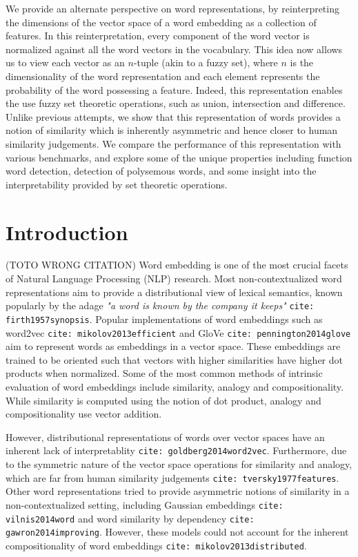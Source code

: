 \documentclass[11pt]{book}
\newcommand{\citep}[1]{\texttt{cite: #1}}
\begin{document}
We provide an alternate perspective on word representations, by
reinterpreting the dimensions of the vector space of a word embedding as a
collection of features. In this reinterpretation, every component of the word
vector is normalized against all the word vectors in the vocabulary. This idea
now allows us to view each vector as an $n$-tuple (akin to a fuzzy set), where
$n$ is the dimensionality of the word representation and each element
represents the probability of the word possessing a feature. Indeed, this
representation enables the use fuzzy set theoretic operations, such as union,
intersection and difference. Unlike previous attempts, we show that this
representation of words provides a notion of similarity which is inherently
asymmetric and hence closer to human similarity judgements. We compare the
performance of this representation with various benchmarks, and explore some of
the unique properties including function word detection, detection of
polysemous words, and some insight into the interpretability provided by set
theoretic operations.

\section{Introduction} \label{sec: intro}

(TOTO \cite{levy2012call} WRONG CITATION)
Word embedding is one of the most crucial facets of Natural Language Processing
(NLP) research. Most non-contextualized word representations aim to provide a
distributional view of lexical semantics, known popularly by the adage
\textit{"a word is known by the company it keeps"} \citep{firth1957synopsis}.
Popular implementations of word embeddings such as word2vec
\citep{mikolov2013efficient} and GloVe \citep{pennington2014glove} aim to
represent words as embeddings in a vector space. These embeddings are trained
to be oriented such that vectors with higher similarities have higher dot
products when normalized. Some of the most common methods of intrinsic
evaluation of word embeddings include similarity, analogy and compositionality.
While similarity is computed using the notion of dot product, analogy and
compositionality use vector addition.

However, distributional representations of words over vector spaces have an
inherent lack of interpretablity \citep{goldberg2014word2vec}. Furthermore, due
to the symmetric nature of the vector space operations for similarity and
analogy, which are far from human similarity judgements
\citep{tversky1977features}. Other word representations tried to provide
asymmetric notions of similarity in a non-contextualized setting, including
Gaussian embeddings \citep{vilnis2014word} and word similarity by dependency
\citep{gawron2014improving}. However, these models could not account for the
inherent compositionality of word embeddings \citep{mikolov2013distributed}. 
\end{document}

